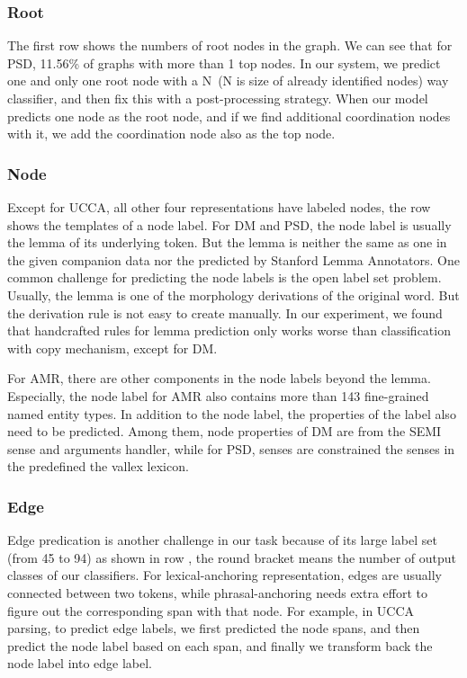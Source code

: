\subsubsection{Root}
\label{sssec:lex:root}

The first row  shows the numbers of root nodes in the graph.
We can see that for PSD, 11.56\% of graphs with more than 1 top
nodes. In our system, we predict one and only one root node with a
N~(N is size of already identified nodes) way classifier, and then fix
this with a post-processing strategy. When our model predicts one node
as the root node, and if we find additional coordination nodes with
it, we add the coordination node also as the top node.

\subsubsection{Node}
\label{sssec:lex:node}

Except for UCCA, all other four representations have labeled
nodes, the row  shows the templates of a node label. For
DM and PSD, the node label is usually the lemma of its underlying
token. But the lemma is neither the same as one in the given companion
data nor the predicted by Stanford Lemma Annotators. One common
challenge for predicting the node labels is the open label set
problem. Usually, the lemma is one of the morphology derivations of
the original word. But the derivation rule is not easy to create
manually. In our experiment, we found that handcrafted rules for lemma
prediction only works worse than classification with copy mechanism,
except for DM.

For AMR, there are other components in the node labels beyond the
lemma. Especially, the node label for AMR also contains more than 143
fine-grained named entity types. In addition to the node label, the
properties of the label also need to be predicted. Among them, node
properties of DM are from the SEMI sense and arguments handler, while
for PSD, senses are constrained the senses in the predefined the
vallex lexicon.

\subsubsection{Edge}
\label{sssec:lex:edge}

Edge predication is another challenge in our task because of its large
label set (from 45 to 94) as shown in row , the
round bracket means the number of output classes of our
classifiers. For lexical-anchoring representation, edges are usually
connected between two tokens, while phrasal-anchoring needs extra
effort to figure out the corresponding span with that node. For
example, in UCCA parsing, to predict edge labels, we first predicted
the node spans, and then predict the node label based on each span,
and finally we transform back the node label into edge label.

